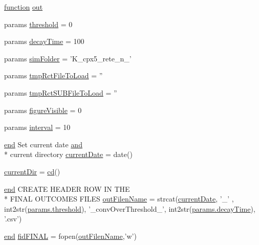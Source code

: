 \begin{DoxyCompactItemize}
\item 
\hyperlink{a00110_a4b4c670b101bf7a838f775e008fa6255}{function} \hyperlink{a00028_a34c820385e9209f49c18739329ad9206}{out}
\item 
params \hyperlink{a00028_aa022cbb28f80299d572def08e7a5ccfd}{threshold} = 0
\item 
params \hyperlink{a00028_abd7ce2c4bf5f563b1e70731f58e8c57d}{decay\-Time} = 100
\item 
params \hyperlink{a00028_a0ffb8131632b48d9111c3a27d91262e2}{sim\-Folder} = 'K\-\_\-cpx5\-\_\-rete\-\_\-n\-\_\-'
\item 
params \hyperlink{a00028_a3b01c97f207a2997c3bd0c2718441509}{tmp\-Rct\-File\-To\-Load} = ''
\item 
params \hyperlink{a00028_ae5d21adddbfe36d5b10d43a2e8b39123}{tmp\-Rct\-S\-U\-B\-File\-To\-Load} = ''
\item 
params \hyperlink{a00028_a0eef57d24680b0a2e17d81a50229e3cb}{figure\-Visible} = 0
\item 
params \hyperlink{a00028_a4d8f56ee83b9b4dbe17b218746a1768c}{interval} = 10
\item 
\hyperlink{a00025_afb358f48b1646c750fb9da6c6585be2b}{end} Set current date \hyperlink{a00028_a170f8acb213f91bf71c77b1d20bceb33}{and} \\*
current directory \hyperlink{a00028_a54768c0405781065cb2f7a16ab8e7d31}{current\-Date} = date()
\item 
\hyperlink{a00028_af32eb97339f1e9d37b5540de2cbc79c9}{current\-Dir} = \hyperlink{a00110_a767271ad82d244871370a0f0e6a7f8a4}{cd}()
\item 
\hyperlink{a00025_afb358f48b1646c750fb9da6c6585be2b}{end} C\-R\-E\-A\-T\-E H\-E\-A\-D\-E\-R R\-O\-W I\-N T\-H\-E \\*
F\-I\-N\-A\-L O\-U\-T\-C\-O\-M\-E\-S F\-I\-L\-E\-S \hyperlink{a00028_af42e186bcb2ad28b937ef14407da1f0d}{out\-Filen\-Name} = strcat(\hyperlink{a00028_a54768c0405781065cb2f7a16ab8e7d31}{current\-Date}, '\-\_\-' , int2str(\hyperlink{a00036_aa022cbb28f80299d572def08e7a5ccfd}{params.\-threshold}), '\-\_\-conv\-Over\-Threshold\-\_\-', int2str(\hyperlink{a00036_afb6aa83fb78c663f3b39be2380842a8b}{params.\-decay\-Time}), '.csv')
\item 
\hyperlink{a00025_afb358f48b1646c750fb9da6c6585be2b}{end} \hyperlink{a00028_a2f1bf22f6a0c3f5791577061e92c0433}{fid\-F\-I\-N\-A\-L} = fopen(\hyperlink{a00028_af42e186bcb2ad28b937ef14407da1f0d}{out\-Filen\-Name},'w')
\item 

\end{DoxyCompactItemize}
